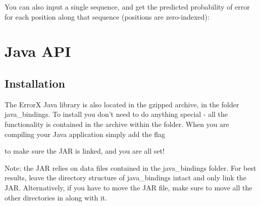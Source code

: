 \documentclass[letterpaper,10pt,english]{sphinxmanual}
\begin{document}
You can also input a single sequence, and get the predicted probability of error for each position along that sequence (positions are zero-indexed):

\begin{sphinxVerbatim}[commandchars=\\\{\}]
  
  
  

      

 \PYG{p}{[}\PYG{p}{]} 
\end{sphinxVerbatim}


\chapter{Java API}
\label{\detokenize{index:java-api}}

\section{Installation}
\label{\detokenize{index:id3}}
The ErrorX Java library is also located in the gzipped archive, in the folder java\_bindings. To install you don’t need to do anything special - all the functionality is contained in the  archive within the  folder. When you are compiling your Java application simply add the flag

\begin{sphinxVerbatim}[commandchars=\\\{\}]
 
\end{sphinxVerbatim}

to make sure the JAR is linked, and you are all set!

Note: the JAR relies on data files contained in the java\_bindings folder. For best results, leave the directory structure of java\_bindings intact and only link the JAR. Alternatively, if you have to move the JAR file, make sure to move all the other directories in  along with it.
\end{document}
